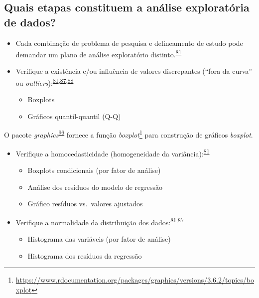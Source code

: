 \documentclass[
  a4paper,
]{book}
\renewcommand{\href}[2]{#2\footnote{\url{#1}}}
\newenvironment{infobox}[1]
  {
  \begin{itemize}
  \renewcommand{\labelitemi}{
    \raisebox{-.7\height}[0pt][0pt]{
      {\setkeys{Gin}{width=3em,keepaspectratio}
        \texttt{[image: \#1]}}
    }
  }
  \setlength{\fboxsep}{1em}
  \begin{blackbox}
  \item
  }
  {
  \end{blackbox}
  \end{itemize}
  }
\begin{document}
\hypertarget{quais-etapas-constituem-a-anuxe1lise-exploratuxf3ria-de-dados}{%
\subsection{Quais etapas constituem a análise exploratória de dados?}\label{quais-etapas-constituem-a-anuxe1lise-exploratuxf3ria-de-dados}}

\begin{itemize}
\item
  Cada combinação de problema de pesquisa e delineamento de estudo pode demandar um plano de análise exploratório distinto.\textsuperscript{\protect\hyperlink{ref-zuur2009}{81}}
\item
  Verifique a existência e/ou influência de valores discrepantes (``fora da curva'' ou \emph{outliers}):\textsuperscript{\protect\hyperlink{ref-zuur2009}{81},\protect\hyperlink{ref-chatfield1986}{87},\protect\hyperlink{ref-Ferketich1986}{88}}

  \begin{itemize}
  \item
    Boxplots
  \item
    Gráficos quantil-quantil (Q-Q)
  \end{itemize}
\end{itemize}

\begin{infobox}{images/Rlogo}
O pacote \emph{graphics}\textsuperscript{\protect\hyperlink{ref-graphics}{96}} fornece a função \href{https://www.rdocumentation.org/packages/graphics/versions/3.6.2/topics/boxplot}{\emph{boxplot}} para construção de gráficos \emph{boxplot}.

\end{infobox}

\begin{itemize}
\item
  Verifique a homocedasticidade (homogeneidade da variância):\textsuperscript{\protect\hyperlink{ref-zuur2009}{81}}

  \begin{itemize}
  \item
    Boxplots condicionais (por fator de análise)
  \item
    Análise dos resíduos do modelo de regressão
  \item
    Gráfico resíduos vs.~valores ajustados
  \end{itemize}
\end{itemize}

\begin{itemize}
\item
  Verifique a normalidade da distribuição dos dados:\textsuperscript{\protect\hyperlink{ref-zuur2009}{81},\protect\hyperlink{ref-chatfield1986}{87}}

  \begin{itemize}
  \item
    Histograma das variáveis (por fator de análise)
  \item
    Histograma dos resíduos da regressão
  \end{itemize}
\end{itemize}
\end{document}
